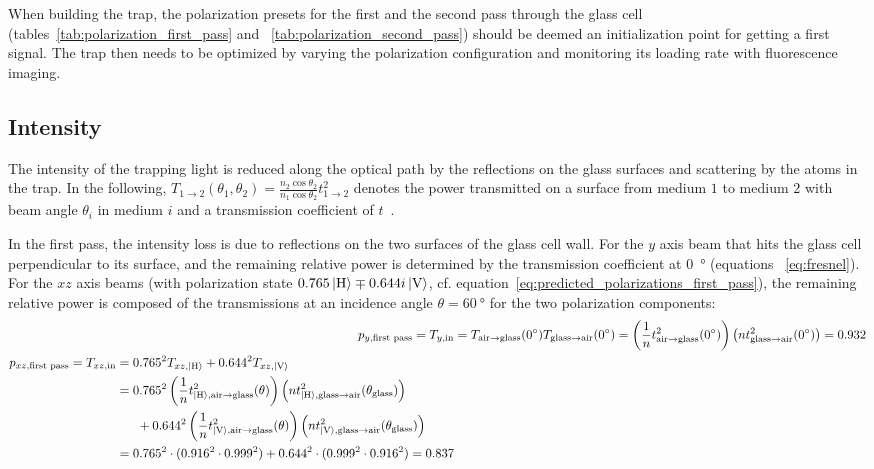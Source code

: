 When building the trap, the polarization presets for the first and the second pass through the glass cell (tables~\ref{tab:polarization_first_pass} and ~\ref{tab:polarization_second_pass}) should be deemed an initialization point for getting a first signal. The trap then needs to be optimized by varying the polarization configuration and monitoring its loading rate with fluorescence imaging.

\subsection*{Intensity}
The intensity of the trapping light is reduced along the optical path by the reflections on the glass surfaces and scattering by the atoms in the trap. In the following, $T_{1 \rightarrow 2}(\theta_1, \theta_2) = \frac{n_2 \cos \theta_2 }{n_1 \cos \theta_2} t_{1\rightarrow 2}^2$ denotes the power transmitted on a surface from medium $1$ to medium $2$ with beam angle $\theta_i$ in medium $i$ and a transmission coefficient of $t$~\cite{demtroder_elektromagnetische_2013}.

In the first pass, the intensity loss is due to reflections on the two surfaces of the glass cell wall. For the $y$ axis beam that hits the glass cell perpendicular to its surface, and the remaining relative power is determined by the transmission coefficient at \SI{0}{\degree} (equations ~\ref{eq:fresnel}). For the $xz$ axis beams (with polarization state $0.765 \Ket{\text{H}} \mp 0.644i \Ket{\text{V}}$, cf. equation~\ref{eq:predicted_polarizations_first_pass}), the remaining relative power is composed of the transmissions at an incidence angle $\theta = \SI{60}{\degree}$ for the two polarization components:
\begin{align}
    p_{y, \text{first pass}} = T_{y, \text{in}} &= T_{\text{air} \rightarrow \text{glass}}(\SI{0}{\degree}) T_{\text{glass} \rightarrow \text{air}}(\SI{0}{\degree}) = \left(\frac{1}{n} t^2_{\text{air} \rightarrow \text{glass}}(\SI{0}{\degree})\right) \left(n t^2_{\text{glass} \rightarrow \text{air}}(\SI{0}{\degree})\right) = \SI{0.932}{}\\
    \begin{split}
        p_{xz, \text{first pass}} = T_{xz, \text{in}} &= 0.765^2 T_{xz, \Ket{\text{H}}} + 0.644^2 T_{xz, \Ket{\text{V}}} \\
        &=  0.765^2 \left(\frac{1}{n} t^2_{\Ket{\text{H}}, \text{air} \rightarrow \text{glass}}(\theta)\right) \left(n t^2_{\Ket{\text{H}}, \text{glass} \rightarrow \text{air}}(\theta_\text{glass})\right) \\ &~~~~~+ 0.644^2 \left(\frac{1}{n} t^2_{\Ket{\text{V}}, \text{air} \rightarrow \text{glass}}(\theta)\right) \left(n t^2_{\Ket{\text{V}}, \text{glass} \rightarrow \text{air}}(\theta_\text{glass})\right) \\
        &= 0.765^2 \cdot (0.916^2 \cdot 0.999^2) + 0.644^2 \cdot (0.999^2 \cdot 0.916^2) = 0.837
    \end{split}
\end{align}

